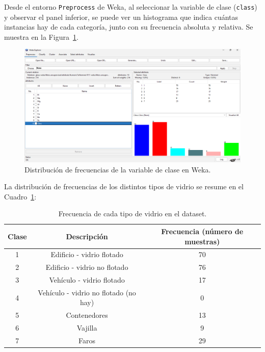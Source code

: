 \documentclass{article}
\begin{document}
Desde el entorno \texttt{Preprocess} de Weka, al seleccionar la variable de clase (\texttt{class}) y observar el panel inferior, se puede ver un histograma que indica cuántas instancias hay de cada categoría, junto con su frecuencia absoluta y relativa. Se muestra en la Figura~\ref{fig:weka-class-dist}.

\begin{figure}[!ht]
    \centering
    \includegraphics[width=0.8\linewidth]{Imágenes/weka-class-dist.png}
    \caption{Distribución de frecuencias de la variable de clase en Weka.}
    \label{fig:weka-class-dist}
\end{figure}

La distribución de frecuencias de los distintos tipos de vidrio se resume en el Cuadro~\ref{tab:frecuencia-clase}:

\begin{table}[!ht]
    \centering
    \caption{Frecuencia de cada tipo de vidrio en el dataset.}
    \label{tab:frecuencia-clase}
    \begin{tabular}{|c|c|c|}
        \hline
        \textbf{Clase} & \textbf{Descripción} & \textbf{Frecuencia (número de muestras)} \\
        \hline
        1 & Edificio - vidrio flotado              &      70          \\
        \hline
        2 & Edificio - vidrio no flotado           &      76          \\
        \hline
        3 & Vehículo - vidrio flotado              &       17         \\
        \hline
        4 & Vehículo - vidrio no flotado (no hay)  & 0              \\
        \hline
        5 & Contenedores                             &    13            \\
        \hline
        6 & Vajilla                           &       9         \\
        \hline
        7 & Faros                              &        29        \\
        \hline
    \end{tabular}
\end{table}
\end{document}
